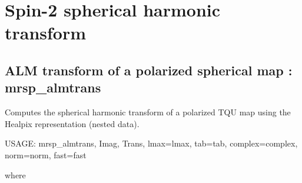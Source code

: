 \section{Spin-2 spherical harmonic transform}
 
\subsection{ALM transform of a polarized spherical map : mrsp\_almtrans}
Computes the spherical harmonic transform of a polarized TQU map using the Healpix representation (nested data).
{\bf
\begin{center}
     USAGE: mrsp\_almtrans, Imag, Trans, lmax=lmax, tab=tab, complex=complex, norm=norm, fast=fast
\end{center}}
where
